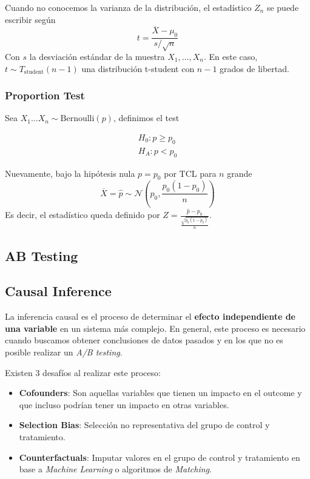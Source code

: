Cuando no conocemos la varianza de la distribución, el estadístico $Z_n$ se puede escribir según 
$$ 
t = \frac{\overline{X} - \mu_0}{s / \sqrt{n}}
$$
Con $s$ la desviación estándar de la muestra $X_1 , \dots, X_n$. En este caso, $t \sim T_{\text{student}}(n-1)$ una distribución t-student con $n-1$ grados de libertad. 

\subsubsection{Proportion Test}

Sea $X_1 \dots X_n \sim \text{Bernoulli}(p)$, definimos el test 

\begin{equation*}
\begin{aligned}
    H_0: p \geq p_0 \\ 
    H_A: p < p_0
\end{aligned}
\end{equation*}

Nuevamente, bajo la hipótesis nula $p = p_0$ por TCL para $n$ grande
$$ 
\overline{X} = \hat{p} \sim \mathcal{N} \left ( p_0 , \frac{p_0(1-p_0)}{n} \right )
$$
Es decir, el estadístico queda definido por $Z = \frac{\hat{p} - p_0}{\frac{\sqrt{p_0(1-p_0)}}{n}}$. 

\subsection{AB Testing}


\subsection{Causal Inference}

La inferencia causal es el proceso de determinar el \textbf{efecto independiente de una variable} en un sistema más complejo. En general, este proceso es necesario cuando buscamos obtener conclusiones de datos pasados y en los que no es posible realizar un \textit{A/B testing}.

Existen 3 desafíos al realizar este proceso: 
\begin{itemize}
    \item \textbf{Cofounders}: Son aquellas variables que tienen un impacto en el outcome y que incluso podrían tener un impacto en otras variables. 
    \item \textbf{Selection Bias}: Selección no representativa del grupo de control y tratamiento.
    \item \textbf{Counterfactuals}: Imputar valores en el grupo de control y tratamiento en base a \textit{Machine Learning} o algoritmos de \textit{Matching}. 
\end{itemize}

